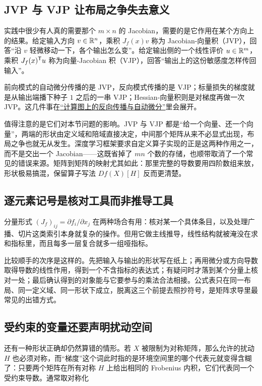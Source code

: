 \subsection{JVP 与 VJP 让布局之争失去意义}

实践中很少有人真的需要那个 \(m\times n\) 的 Jacobian，需要的是它作用在某个方向上的结果。给定输入方向 \(v\in\mathbb{R}^n\)，乘积 \(J_f(x)v\) 称为 Jacobian-向量积（JVP），回答``沿 \(v\) 轻微移动一下，各个输出怎么变''。给定输出侧的一个线性评价 \(u\in\mathbb{R}^m\)，乘积 \(J_f(x)^{\mathsf{T}}u\) 称为向量-Jacobian 积（VJP），回答``输出上的这份敏感度怎样传回输入''。

前向模式的自动微分传播的是 JVP，反向模式传播的是 VJP；标量损失的梯度就是从输出端播下种子 \(1\) 之后的一串 VJP；Hessian-向量积则是对梯度再做一次 JVP。这几件事在\hyperref[sec:10-Matrix-Calculus/04-Applications/03]{``计算图上的反向传播与自动微分''}里会展开。

值得注意的是它们对本节问题的影响。JVP 与 VJP 都是``给一个向量、还一个向量''，两端的形状由定义域和陪域直接决定，中间那个矩阵从来不必显式出现，布局之争也就无从发生。深度学习框架要求自定义算子实现的正是这两种作用之一，而不是交出一个 Jacobian——这既省掉了 \(mn\) 个数的存储，也顺带取消了一个常见的错误来源。矩阵到矩阵的映射尤其如此：那里完整的导数要用四阶数组来放，形状极易搞混，保留算子写法 \(Df(X)[H]\) 反而更清楚。

\subsection{逐元素记号是核对工具而非推导工具}

分量形式 \((J_f)_{ij}=\partial f_i/\partial x_j\) 在两种场合有用：核对某一个具体条目，以及处理广播、切片这类索引本身就复杂的操作。但用它做主线推导，线性结构就被淹没在求和指标里，而且每多一层复合就多一组哑指标。

比较顺手的次序是这样的。先把输入与输出的形状写在纸上；再用微分或方向导数取得导数的线性作用，得到一个不含指标的表达式；有疑问时才落到某个分量上核对一处；最后确认得到的对象能与它要参与的乘法合法相接。公式表只在同一布局、同一定义域、同一形状下成立，脱离这三个前提去照抄符号，是矩阵求导里最常见的出错方式。

\subsection{受约束的变量还要声明扰动空间}

还有一种形状正确却仍然算错的情形。若 \(X\) 被限制为对称矩阵，那么允许的扰动 \(H\) 也必须对称，而``梯度''这个词此时指的是环境空间里的哪个代表元就变得含糊了：只要两个矩阵在所有对称 \(H\) 上给出相同的 Frobenius 内积，它们代表同一个受约束导数。通常取对称化

